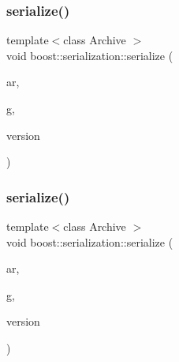 \mbox{\label{namespaceboost_1_1serialization_a61458ca4ff4153850af0c3adb4a322e5}} 
\subsubsection{\texorpdfstring{serialize()}{serialize()}\hspace{0.1cm}{\footnotesize\ttfamily [1/3]}}
{\footnotesize\ttfamily template$<$class Archive $>$ \\
void boost\+::serialization\+::serialize (\begin{DoxyParamCaption}\item[{Archive \&}]{ar,  }\item[{\hyperlink{structpan_1_1_game_data}{pan\+::\+Game\+Data} \&}]{g,  }\item[{const unsigned int}]{version }\end{DoxyParamCaption})}

\mbox{\label{namespaceboost_1_1serialization_abdc673b3465f1623bbcb5147b157d017}} 
\subsubsection{\texorpdfstring{serialize()}{serialize()}\hspace{0.1cm}{\footnotesize\ttfamily [2/3]}}
{\footnotesize\ttfamily template$<$class Archive $>$ \\
void boost\+::serialization\+::serialize (\begin{DoxyParamCaption}\item[{Archive \&}]{ar,  }\item[{\hyperlink{structpan_1_1_deck_data}{pan\+::\+Deck\+Data} \&}]{g,  }\item[{const unsigned int}]{version }\end{DoxyParamCaption})}

\mbox{\label{namespaceboost_1_1serialization_af7995dd0297acbf25eed2a5de6f7b1ba}} 
